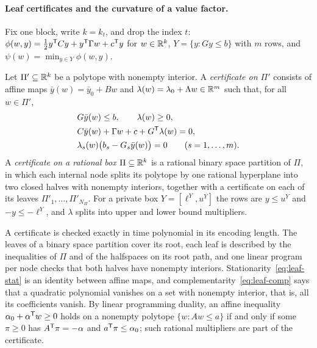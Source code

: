 \paragraph{Leaf certificates and the curvature of a value factor.}
Fix one block, write $k=k_t$, and drop the index $t$:
$\phi(w,y)=\frac12y^{\mathsf T}Cy+y^{\mathsf T}\Gamma w+c^{\mathsf T}y$ for $w\in\mathbb R^k$,
$Y=\{y:Gy\le b\}$ with $m$ rows, and $\psi(w)=\min_{y\in Y}\phi(w,y)$.

\begin{definition}\label{def:leaf}
Let $\Pi'\subseteq\mathbb R^k$ be a polytope with nonempty interior. A
\emph{certificate on $\Pi'$} consists of affine maps
$\bar y(w)=\bar y_0+Bw$ and $\lambda(w)=\lambda_0+\Lambda w\in\mathbb R^m$ such
that, for all $w\in\Pi'$,
\begin{align}
&G\bar y(w)\le b,\qquad \lambda(w)\ge0,\label{eq:leaf-feas}\\
&C\bar y(w)+\Gamma w+c+G^{\mathsf T}\lambda(w)=0,\label{eq:leaf-stat}\\
&\lambda_s(w)\bigl(b_s-G_s\bar y(w)\bigr)=0\qquad(s=1,\ldots,m).\label{eq:leaf-comp}
\end{align}
A \emph{certificate on a rational box $\Pi\subseteq\mathbb R^k$} is a rational
binary space partition of $\Pi$, in which each internal node splits its
polytope by one rational hyperplane into two closed halves with nonempty
interiors, together with a certificate on each of its leaves
$\Pi'_1,\ldots,\Pi'_{N_\Pi}$. For a private box $Y=[\ell^Y,u^Y]$ the rows are
$y\le u^Y$ and $-y\le-\ell^Y$, and $\lambda$ splits into upper and lower
bound multipliers.
\end{definition}

A certificate is checked exactly in time polynomial in its encoding length.
The leaves of a binary space partition cover its root, each leaf is
described by the inequalities of $\Pi$ and of the halfspaces on its root
path, and one linear program per node checks that both halves have
nonempty interiors. Stationarity~\eqref{eq:leaf-stat} is an identity between
affine maps, and complementarity~\eqref{eq:leaf-comp} says that a quadratic
polynomial vanishes on a set with nonempty interior, that is, all its
coefficients vanish. By linear programming duality, an affine inequality
$\alpha_0+\alpha^{\mathsf T}w\ge0$ holds on a nonempty polytope $\{w:Aw\le a\}$ if
and only if some $\pi\ge0$ has $A^{\mathsf T}\pi=-\alpha$ and
$a^{\mathsf T}\pi\le\alpha_0$; such rational multipliers are part of the
certificate.

